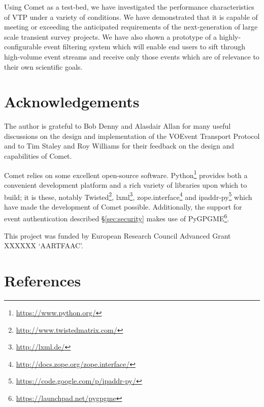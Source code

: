 \documentclass[5p,authoryear]{elsarticle}
\begin{document}
Using Comet as a test-bed, we have investigated the performance characteristics
of VTP under a variety of conditions. We have demonstrated that it is capable
of meeting or exceeding the anticipated requirements of the next-generation of
large scale transient survey projects. We have also shown a prototype of a
highly-configurable event filtering system which will enable end users to
sift through high-volume event streams and receive only those events which are
of relevance to their own scientific goals.

\section{Acknowledgements}
\label{sec:ack}

The author is grateful to Bob Denny and Alasdair Allan for many useful
discussions on the design and implementation of the VOEvent Transport Protocol
and to Tim Staley and Roy Williams for their feedback on the design and
capabilities of Comet.

Comet relies on some excellent open-source software.
Python\footnote{\url{https://www.python.org/}} provides both a convenient
development platform and a rich variety of libraries upon which to build; it
is these, notably Twisted\footnote{\url{http://www.twistedmatrix.com/}},
lxml\footnote{\url{http://lxml.de/}},
zope.interface\footnote{\url{http://docs.zope.org/zope.interface/}} and
ipaddr-py\footnote{\url{https://code.google.com/p/ipaddr-py/}} which have made
the development of Comet possible. Additionally, the support for event
authentication described \S\ref{sec:security} makes use of
PyGPGME\footnote{\url{https://launchpad.net/pygpgme}}.

This project was funded by European Research Council Advanced Grant XXXXXX
`AARTFAAC'.

\section*{References}



\end{document}
